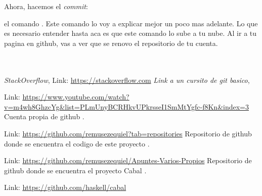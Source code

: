 \documentclass[10pt,journal,compsoc]{IEEEtran}
\begin{document}
Ahora, hacemos el \textit{commit}:



 el comando \textit{\color{Blue}{git push origin master}}. Este comando lo voy a explicar mejor un poco mas adelante. Lo que es necesario entender hasta aca es que este comando lo sube a tu nube. Al ir a tu pagina en github, vas a ver que se renovo el repositorio de tu cuenta.
\\
\\
\\


\newpage
\begin{thebibliography}{1}
%
 \emph{StackOverflow}, 
 Link: \textcolor{Red}{\url{https://stackoverflow.com}}
%
 \emph{Link a un cursito de git basico}, 
 
 Link: \textcolor{Red}{\url{https://www.youtube.com/watch?v=m4wh8GhzcYg&list=PLmUnyBCRHkvUPkrsseI1SmMtYgfc-f8Kn&index=3}}
Cuenta propia de github \emph{}.

 Link: \textcolor{Red}{\url{https://github.com/remusezequiel?tab=repositories}}
% 
%
Repositorio de github donde se encuentra el codigo de este proyecto  \emph{}.

 Link: \textcolor{Red}{\url{https://github.com/remusezequiel/Apuntes-Varios-Propios}}
% 
%
Repositorio de github donde se encuentra el proyecto Cabal  \emph{}.

 Link: \textcolor{Red}{\url{https://github.com/haskell/cabal}}


\end{thebibliography}
\end{document}
